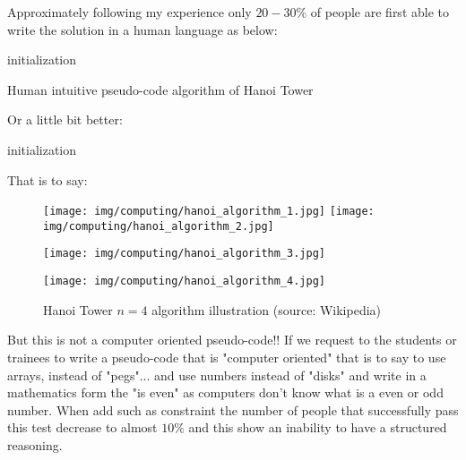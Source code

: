 	Approximately following my experience only $20-30\%$ of people are first able to write the solution in a human language as below:
	
	\begin{algorithm}[H]
	 initialization\;
	 \caption{Human intuitive pseudo-code algorithm of Hanoi Tower}
	\end{algorithm}
	
	Or a little bit better:
	
	\begin{algorithm}[H]
	initialization\;
	\end{algorithm}
	That is to say:
	\begin{figure}[H]
		\centering
		\texttt{[image: img/computing/hanoi\_algorithm\_1.jpg]}
		\texttt{[image: img/computing/hanoi\_algorithm\_2.jpg]}
	\end{figure}
	\begin{figure}[H]
		\centering
		\texttt{[image: img/computing/hanoi\_algorithm\_3.jpg]}
	\end{figure}
	\begin{figure}[H]
		\centering
		\texttt{[image: img/computing/hanoi\_algorithm\_4.jpg]}
		\caption{Hanoi Tower $n=4$ algorithm illustration (source: Wikipedia)}
	\end{figure}
	
	But this is not a computer oriented pseudo-code!! If we request to the students or trainees to write a pseudo-code that is "computer oriented" that is to say to use arrays, instead of "pegs"... and use numbers instead of "disks" and write in a mathematics form the "is even" as computers don't know what is a even or odd number. When add such as constraint the number of people that successfully pass this test decrease to almost $10\%$ and this show an inability to have a structured reasoning.
	
